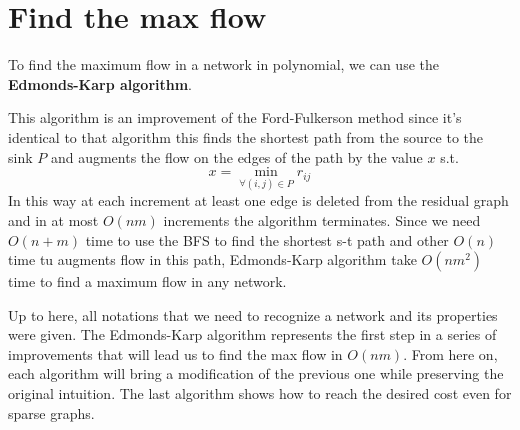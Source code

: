\section{Find the max flow}
To find the maximum flow in a network in polynomial, we can use the \textbf{Edmonds-Karp algorithm}\cite{Edmonds_Karp}.

This algorithm is an improvement of the Ford-Fulkerson\cite{FordFulkerson} method since it's identical to that algorithm this finds the shortest path from the source to the sink $P$ and augments the flow on the edges of the path by the value $x$ s.t.
\[x = \min_{\forall (i,j)\in P} r_{ij}\]
In this way at each increment at least one edge is deleted from the residual graph and in at most $O(nm)$ increments the algorithm terminates.
Since we need $O(n+m)$ time to use the BFS to find the shortest s-t path and other $O(n)$ time tu augments flow in this path, Edmonds-Karp algorithm take $O(nm^2)$ time to find a maximum flow in any network.

Up to here, all notations that we need to recognize a network and its properties were given. The Edmonds-Karp algorithm represents the first step in a series of improvements that will lead us to find the max flow in $O(nm)$. From here on, each algorithm will bring a modification of the previous one while preserving the original intuition. The last algorithm shows how to reach the desired cost even for sparse graphs.

\cleardoublepage
